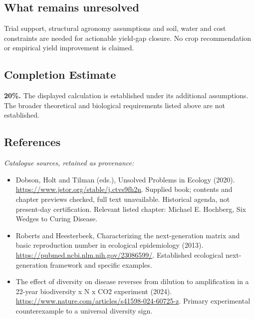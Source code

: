 \documentclass[11pt]{article}
\begin{document}
\subsection{What remains unresolved}
Trial support, structural agronomy assumptions and soil, water and cost constraints are needed for actionable yield-gap closure. No crop recommendation or empirical yield improvement is claimed.
\subsection{Completion Estimate}
\textbf{20\%.} The displayed calculation is established under its additional assumptions. The broader theoretical and biological requirements listed above are not established.
\subsection{References}
\noindent\emph{Catalogue sources, retained as provenance:}
\begin{itemize}
\item Dobson, Holt and Tilman (eds.), Unsolved Problems in Ecology (2020). \url{https://www.jstor.org/stable/j.ctvs9fh2n}. Supplied book; contents and chapter previews checked, full text unavailable. Historical agenda, not present-day certification. Relevant listed chapter: Michael E. Hochberg, Six Wedges to Curing Disease.
\item Roberts and Heesterbeek, Characterizing the next-generation matrix and basic reproduction number in ecological epidemiology (2013). \url{https://pubmed.ncbi.nlm.nih.gov/23086599/}. Established ecological next-generation framework and specific examples.
\item The effect of diversity on disease reverses from dilution to amplification in a 22-year biodiversity x N x CO2 experiment (2024). \url{https://www.nature.com/articles/s41598-024-60725-z}. Primary experimental counterexample to a universal diversity sign.
\end{itemize}
\end{document}
